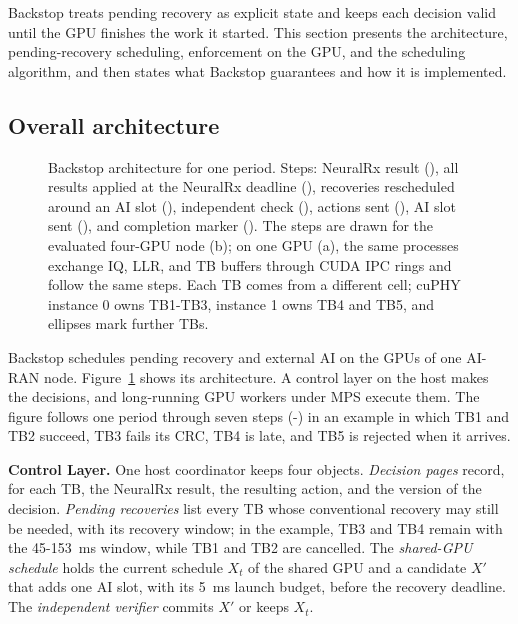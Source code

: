 \documentclass[acmsmall,screen,review,anonymous]{acmart}
\newcommand{\sys}{Backstop\xspace}
\newcommand{\NRx}{NeuralRx\xspace}
\begin{document}
\sys treats pending recovery as explicit state and keeps each decision valid until the GPU finishes the
work it started. This section presents the architecture, pending-recovery scheduling, enforcement on the
GPU, and the scheduling algorithm, and then states what \sys guarantees and how it is implemented.

\subsection{Overall architecture}
\label{sec:design-overall}

\begin{figure}[t]
  \centering
  
  \caption{\sys architecture for one period. Steps: \NRx result (), all results applied at the
  \NRx deadline (), recoveries rescheduled around an AI slot (), independent check
  (), actions sent (), AI slot sent (), and completion marker
  (). The steps are drawn for the evaluated four-GPU node (b); on one GPU (a), the same
  processes exchange IQ, LLR, and TB buffers through CUDA IPC rings and follow the same steps. Each TB
  comes from a different cell; cuPHY instance 0 owns TB1-TB3, instance 1 owns TB4 and TB5, and ellipses
  mark further TBs.}
  \label{fig:overall}
\end{figure}

\sys schedules pending recovery and external AI on the GPUs of one AI-RAN node.
Figure~\ref{fig:overall} shows its architecture. A control layer on the host makes the decisions, and
long-running GPU workers under MPS execute them. The figure follows one period through seven steps
(-) in an example in which TB1 and TB2 succeed, TB3 fails its CRC, TB4 is late, and
TB5 is rejected when it arrives.

\noindent\textbf{Control Layer.}
One host coordinator keeps four objects. \textit{Decision pages} record, for each TB, the \NRx result,
the resulting action, and the version of the decision. \textit{Pending recoveries} list every TB whose
conventional recovery may still be needed, with its recovery window; in the example, TB3 and TB4 remain
with the 45-153~ms window, while TB1 and TB2 are cancelled. The \textit{shared-GPU schedule} holds the
current schedule $X_t$ of the shared GPU and a candidate $X'$ that adds one AI slot, with its 5~ms launch
budget, before the recovery deadline. The \textit{independent verifier} commits $X'$ or keeps $X_t$.
\end{document}
